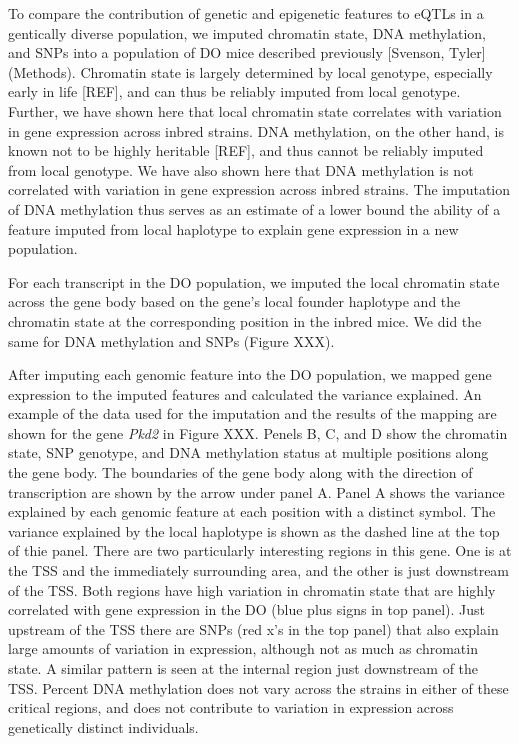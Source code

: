 \documentclass[10pt,letterpaper]{article}
\begin{document}
To compare the contribution of genetic and epigenetic features to eQTLs
in a gentically diverse population, we imputed chromatin state, DNA
methylation, and SNPs into a population of DO mice described previously
{[}Svenson, Tyler{]} (Methods). Chromatin state is largely determined by
local genotype, especially early in life {[}REF{]}, and can thus be
reliably imputed from local genotype. Further, we have shown here that
local chromatin state correlates with variation in gene expression
across inbred strains. DNA methylation, on the other hand, is known not
to be highly heritable {[}REF{]}, and thus cannot be reliably imputed
from local genotype. We have also shown here that DNA methylation is not
correlated with variation in gene expression across inbred strains. The
imputation of DNA methylation thus serves as an estimate of a lower
bound the ability of a feature imputed from local haplotype to explain
gene expression in a new population.

For each transcript in the DO population, we imputed the local chromatin
state across the gene body based on the gene's local founder haplotype
and the chromatin state at the corresponding position in the inbred
mice. We did the same for DNA methylation and SNPs (Figure XXX).

After imputing each genomic feature into the DO population, we mapped
gene expression to the imputed features and calculated the variance
explained. An example of the data used for the imputation and the
results of the mapping are shown for the gene \textit{Pkd2} in Figure
XXX. Penels B, C, and D show the chromatin state, SNP genotype, and DNA
methylation status at multiple positions along the gene body. The
boundaries of the gene body along with the direction of transcription
are shown by the arrow under panel A. Panel A shows the variance
explained by each genomic feature at each position with a distinct
symbol. The variance explained by the local haplotype is shown as the
dashed line at the top of thie panel. There are two particularly
interesting regions in this gene. One is at the TSS and the immediately
surrounding area, and the other is just downstream of the TSS. Both
regions have high variation in chromatin state that are highly
correlated with gene expression in the DO (blue plus signs in top
panel). Just upstream of the TSS there are SNPs (red x's in the top
panel) that also explain large amounts of variation in expression,
although not as much as chromatin state. A similar pattern is seen at
the internal region just downstream of the TSS. Percent DNA methylation
does not vary across the strains in either of these critical regions,
and does not contribute to variation in expression across genetically
distinct individuals.
\end{document}
